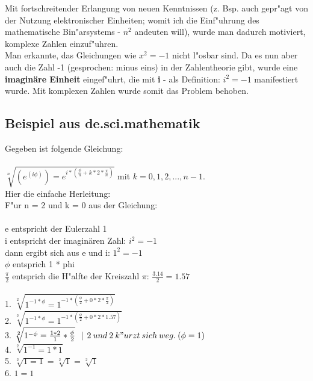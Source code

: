 \documentclass[10pt]{book}
\begin{document}
\begin{itemize}
    Mit fortschreitender Erlangung von neuen Kenntnissen (z. Bsp. auch gepr"agt
    von der Nutzung elektronischer Einheiten; womit ich
    die Einf"uhrung des mathematische Bin"arsystems - $n^2$ andeuten will), wurde man
    dadurch motiviert, komplexe Zahlen einzuf"uhren.\\
    Man erkannte, das Gleichungen wie $x^2 = -1$ nicht l"osbar sind.
    Da es nun aber auch die Zahl -1 (gesprochen: minus eins) in der
    Zahlentheorie gibt, wurde eine \textbf{imaginäre Einheit} eingef"uhrt, die mit \textbf{i}
    - als Definition: \textbf{ $ i^2 = -1 $ }  manifestiert wurde.
    Mit komplexen Zahlen wurde somit das Problem behoben.
\end{itemize}
\subsection{Beispiel aus de.sci.mathematik}

Gegeben ist folgende Gleichung: \\ \\
$\sqrt[n]{(e^{(i \phi)}) = e^{i * (\frac{\phi}{n} + k * 2 * \frac{\pi}{n})} } $ mit  $ k = 0, 1, 2,..., n-1. $ \\

Hier die einfache Herleitung: \\
F"ur n = 2 und k = 0 aus der Gleichung: \\
\\
e entspricht der Eulerzahl 1 \\
i entspricht der imaginären Zahl: \: $ i^2 = -1 $ \\
dann ergibt sich aus e und i: \: $ 1^2 = -1 $ \\
$ \phi $ entsprich 1 * phi \\
$ \frac{\pi}{2} $ entsprich die H"alfte der Kreiszahl $\pi $: $ \frac{3.14}{2} = 1.57 $ \\
\\
1. $ \sqrt[2]{1^{-1 * \phi} = 1^{-1 * (\frac{\phi}{2} + 0 * 2 * \frac{\pi}{2})}} $ \\
2. $ \sqrt[2]{1^{-1 * \phi} = 1^{-1 * (\frac{\phi}{2} + 0 * 2 * 1.57)}} $ \\
3. $ \sqrt[2]{1^{-\phi} = \frac{1 * 2}{1} * \frac{\phi}{2}}  \: \: \: | \: \: 2 \: und \: 2 \: k"urzt \: sich \: weg. \: (\phi = 1)$\\
4. $ \sqrt[2]{1^{-1} = 1 * 1} $ \\
5. $ \sqrt[2]{1 = 1} = \sqrt[2]{1} = \sqrt[2]{1} $ \\
6. $ 1 = 1 $ \\
\\
\end{document}

